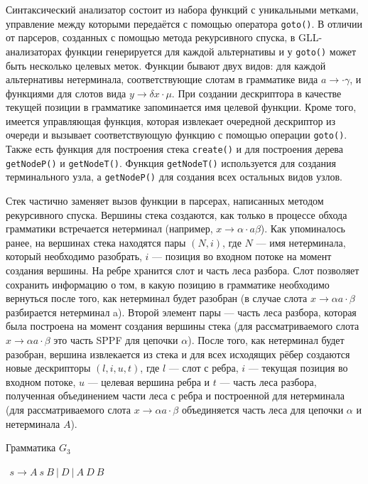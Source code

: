 \documentclass[14pt]{matmex-diploma}
\begin{document}
Синтаксический анализатор состоит из набора функций с уникальными метками, управление между которыми передаётся с помощью оператора \texttt{goto()}. В отличии от парсеров, созданных с помощью метода рекурсивного спуска, в GLL-анализаторах функции генерируется для каждой альтернативы и у \texttt{goto()} может быть несколько целевых меток. Функции бывают двух видов: для каждой альтернативы нетерминала, соответствующие слотам в грамматике вида $a \rightarrow \cdot\gamma$, и функциями для слотов вида $ y \rightarrow \delta x \cdot \mu$. При создании дескриптора в качестве текущей позиции в грамматике запоминается имя целевой функции. Кроме того, имеется управляющая функция, которая извлекает очередной дескриптор из очереди и вызывает соответствующую функцию с помощью операции \texttt{goto()}. Также есть функция для построения стека \texttt{create()} и для построения дерева \texttt{getNodeP()} и \texttt{getNodeT()}. Функция \texttt{getNodeT()} используется для создания терминального узла, а \texttt{getNodeP()} для создания всех остальных видов узлов.

Стек частично заменяет вызов функции в парсерах, написанных методом рекурсивного спуска. Вершины стека создаются, как только в процессе обхода грамматики встречается нетерминал (например, $x \rightarrow \alpha \cdot a \beta$). Как упоминалось ранее, на вершинах стека находятся пары $(N, i)$, где $N$ --- имя нетерминала, который необходимо разобрать, $i$ --- позиция во входном потоке на момент создания вершины. На ребре хранится слот и часть леса разбора. Слот позволяет сохранить информацию о том, в какую позицию в грамматике необходимо вернуться после того, как нетерминал будет разобран (в случае слота $x \rightarrow \alpha a \cdot \beta$ разбирается нетерминал a). Второй элемент пары --- часть леса разбора, которая была построена на момент создания вершины стека (для рассматриваемого слота $x \rightarrow \alpha a \cdot \beta$ это часть SPPF для цепочки $\alpha$). После того, как нетерминал будет разобран, вершина извлекается из стека и для всех исходящих рёбер создаются новые дескрипторы $(l, i, u, t)$, где $l$ --- слот с ребра, $i$ --- текущая позиция во входном потоке, $u$ --- целевая вершина ребра и $t$ --- часть леса разбора, полученная объединением части леса с ребра и построенной для нетерминала (для рассматриваемого слота $x \rightarrow \alpha a \cdot \beta$ объединяется часть леса для цепочки $\alpha$ и нетерминала $A$).

\begin{listing}
\caption{Грамматика $G_3$}
\label{grmG3}
\centering
$\begin{array}{rl}
s \rightarrow A \ s \ B \ | \ D \ | \ A \ D \ B 
\end{array}$
\end{listing}
\end{document}
